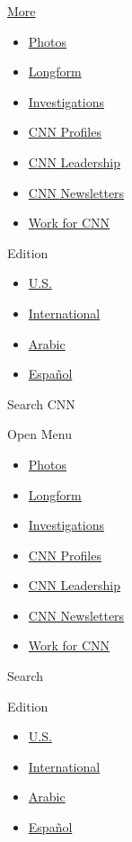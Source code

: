 \href{/more}{More}

\begin{itemize}
\tightlist
\item
  \href{/specials/photos}{Photos}
\item
  \href{/specials/cnn-longform}{Longform}
\item
  \href{/specials/cnn-investigates}{Investigations}
\item
  \href{/specials/profiles}{CNN Profiles}
\item
  \href{/specials/more/cnn-leadership}{CNN Leadership}
\item
  \href{/email/subscription}{CNN Newsletters}
\item
  \href{https://www.turnerjobs.com/search-jobs?orgIds=1174\&ac=19299}{Work
  for CNN}
\end{itemize}

Edition

\begin{itemize}
\tightlist
\item
  \href{//us.cnn.com?hpt=header_edition-picker}{U.S.}
\item
  \href{//edition.cnn.com?hpt=header_edition-picker}{International}
\item
  \href{//arabic.cnn.com?hpt=header_edition-picker}{Arabic}
\item
  \href{//cnnespanol.cnn.com?hpt=header_edition-picker}{Español}
\end{itemize}

Search CNN

Open Menu

\begin{itemize}
\tightlist
\item
  \href{/specials/photos}{Photos}
\item
  \href{/specials/cnn-longform}{Longform}
\item
  \href{/specials/cnn-investigates}{Investigations}
\item
  \href{/specials/profiles}{CNN Profiles}
\item
  \href{/specials/more/cnn-leadership}{CNN Leadership}
\item
  \href{/email/subscription}{CNN Newsletters}
\item
  \href{https://www.turnerjobs.com/search-jobs?orgIds=1174\&ac=19299}{Work
  for CNN}
\end{itemize}

Search

Edition

\begin{itemize}
\tightlist
\item
  \href{//us.cnn.com?hpt=header_edition-picker}{U.S.}
\item
  \href{//edition.cnn.com?hpt=header_edition-picker}{International}
\item
  \href{//arabic.cnn.com?hpt=header_edition-picker}{Arabic}
\item
  \href{//cnnespanol.cnn.com?hpt=header_edition-picker}{Español}
\end{itemize}

